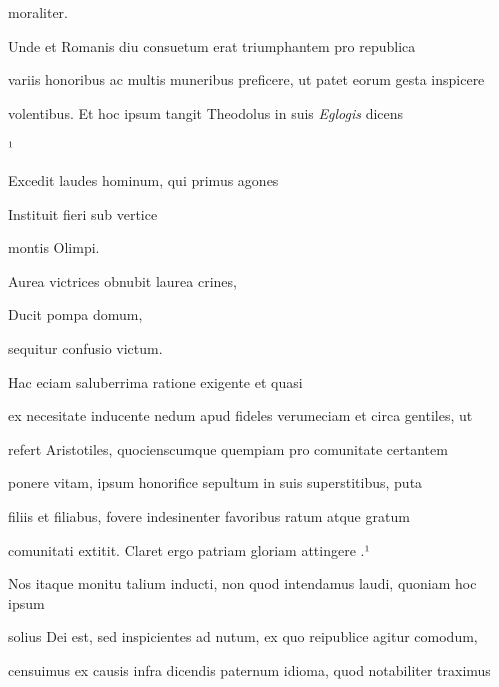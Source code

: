 \splitlines

moraliter. 

\indentK Unde et Romanis diu consuetum erat triumphantem pro republica

\fulllines

variis honoribus ac multis muneribus preficere, ut patet eorum gesta inspicere

volentibus. Et hoc ipsum tangit Theodolus in suis \textit{Eglogis} dicens

\splitlines

¹

\indentKcyt Excedit laudes hominum, qui primus agones

\indentKcyt Instituit fieri sub vertice

\splitlines

\indentKcyt \phantom{Instituit fieri sub vertice }montis Olimpi.	

\indentKcyt Aurea victrices obnubit laurea crines,

\indentKcyt Ducit pompa domum,

\splitlines

\indentKcyt \phantom{Ducit pompa domum, }sequitur confusio victum.

\indentK Hac eciam saluberrima ratione exigente et quasi

\fulllines

ex necesitate inducente nedum apud fideles verumeciam et circa gentiles, ut

refert Aristotiles, quocienscumque quempiam pro comunitate certantem 

 ponere vitam, ipsum honorifice sepultum in suis superstitibus, puta

filiis et filiabus, fovere indesinenter favoribus ratum atque gratum

comunitati extitit. Claret ergo patriam  gloriam attingere .¹

\indentP Nos itaque monitu talium inducti, non quod intendamus laudi, quoniam hoc ipsum

solius Dei est, sed inspicientes ad nutum, ex quo reipublice agitur comodum,

censuimus ex causis infra dicendis paternum idioma, quod notabiliter traximus

